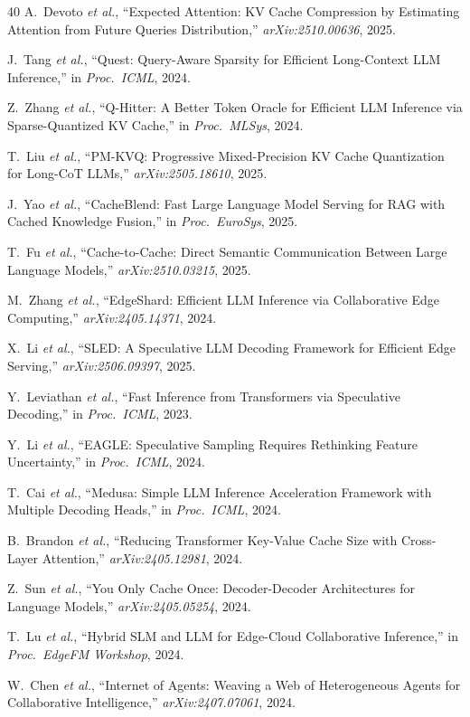 \documentclass[journal]{IEEEtran}
\newcommand{\etal}{\textit{et al.}\xspace}
\begin{document}
\begin{thebibliography}{40}
A.~Devoto \etal, ``Expected Attention: KV Cache Compression by Estimating Attention from Future Queries Distribution,'' \emph{arXiv:2510.00636}, 2025.

J.~Tang \etal, ``Quest: Query-Aware Sparsity for Efficient Long-Context LLM Inference,'' in \emph{Proc.\ ICML}, 2024.

Z.~Zhang \etal, ``Q-Hitter: A Better Token Oracle for Efficient LLM Inference via Sparse-Quantized KV Cache,'' in \emph{Proc.\ MLSys}, 2024.

T.~Liu \etal, ``PM-KVQ: Progressive Mixed-Precision KV Cache Quantization for Long-CoT LLMs,'' \emph{arXiv:2505.18610}, 2025.

J.~Yao \etal, ``CacheBlend: Fast Large Language Model Serving for RAG with Cached Knowledge Fusion,'' in \emph{Proc.\ EuroSys}, 2025.

T.~Fu \etal, ``Cache-to-Cache: Direct Semantic Communication Between Large Language Models,'' \emph{arXiv:2510.03215}, 2025.

M.~Zhang \etal, ``EdgeShard: Efficient LLM Inference via Collaborative Edge Computing,'' \emph{arXiv:2405.14371}, 2024.

X.~Li \etal, ``SLED: A Speculative LLM Decoding Framework for Efficient Edge Serving,'' \emph{arXiv:2506.09397}, 2025.

Y.~Leviathan \etal, ``Fast Inference from Transformers via Speculative Decoding,'' in \emph{Proc.\ ICML}, 2023.

Y.~Li \etal, ``EAGLE: Speculative Sampling Requires Rethinking Feature Uncertainty,'' in \emph{Proc.\ ICML}, 2024.

T.~Cai \etal, ``Medusa: Simple LLM Inference Acceleration Framework with Multiple Decoding Heads,'' in \emph{Proc.\ ICML}, 2024.

B.~Brandon \etal, ``Reducing Transformer Key-Value Cache Size with Cross-Layer Attention,'' \emph{arXiv:2405.12981}, 2024.

Z.~Sun \etal, ``You Only Cache Once: Decoder-Decoder Architectures for Language Models,'' \emph{arXiv:2405.05254}, 2024.

T.~Lu \etal, ``Hybrid SLM and LLM for Edge-Cloud Collaborative Inference,'' in \emph{Proc.\ EdgeFM Workshop}, 2024.

W.~Chen \etal, ``Internet of Agents: Weaving a Web of Heterogeneous Agents for Collaborative Intelligence,'' \emph{arXiv:2407.07061}, 2024.


\end{thebibliography}
\end{document}
